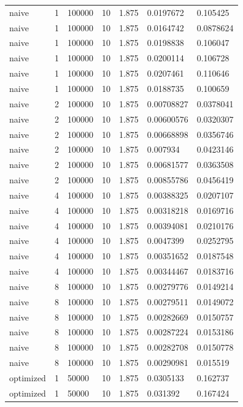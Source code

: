 \begin{table}[ht]
\begin{tabular}{lllllll}
naive & 1 & 100000 & 10 & 1.875 & 0.0197672 & 0.105425 \\ 
naive & 1 & 100000 & 10 & 1.875 & 0.0164742 & 0.0878624 \\ 
naive & 1 & 100000 & 10 & 1.875 & 0.0198838 & 0.106047 \\ 
naive & 1 & 100000 & 10 & 1.875 & 0.0200114 & 0.106728 \\ 
naive & 1 & 100000 & 10 & 1.875 & 0.0207461 & 0.110646 \\ 
naive & 1 & 100000 & 10 & 1.875 & 0.0188735 & 0.100659 \\ 
naive & 2 & 100000 & 10 & 1.875 & 0.00708827 & 0.0378041 \\ 
naive & 2 & 100000 & 10 & 1.875 & 0.00600576 & 0.0320307 \\ 
naive & 2 & 100000 & 10 & 1.875 & 0.00668898 & 0.0356746 \\ 
naive & 2 & 100000 & 10 & 1.875 & 0.007934 & 0.0423146 \\ 
naive & 2 & 100000 & 10 & 1.875 & 0.00681577 & 0.0363508 \\ 
naive & 2 & 100000 & 10 & 1.875 & 0.00855786 & 0.0456419 \\ 
naive & 4 & 100000 & 10 & 1.875 & 0.00388325 & 0.0207107 \\ 
naive & 4 & 100000 & 10 & 1.875 & 0.00318218 & 0.0169716 \\ 
naive & 4 & 100000 & 10 & 1.875 & 0.00394081 & 0.0210176 \\ 
naive & 4 & 100000 & 10 & 1.875 & 0.0047399 & 0.0252795 \\ 
naive & 4 & 100000 & 10 & 1.875 & 0.00351652 & 0.0187548 \\ 
naive & 4 & 100000 & 10 & 1.875 & 0.00344467 & 0.0183716 \\ 
naive & 8 & 100000 & 10 & 1.875 & 0.00279776 & 0.0149214 \\ 
naive & 8 & 100000 & 10 & 1.875 & 0.00279511 & 0.0149072 \\ 
naive & 8 & 100000 & 10 & 1.875 & 0.00282669 & 0.0150757 \\ 
naive & 8 & 100000 & 10 & 1.875 & 0.00287224 & 0.0153186 \\ 
naive & 8 & 100000 & 10 & 1.875 & 0.00282708 & 0.0150778 \\ 
naive & 8 & 100000 & 10 & 1.875 & 0.00290981 & 0.015519 \\ 
optimized & 1 & 50000 & 10 & 1.875 & 0.0305133 & 0.162737 \\ 
optimized & 1 & 50000 & 10 & 1.875 & 0.031392 & 0.167424 \\ 

\end{tabular}
\end{table}
